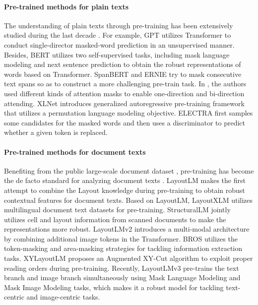 \documentclass[11pt]{article}
\begin{document}
\paragraph{Pre-trained methods for plain texts} The understanding of plain texts through pre-training has been extensively studied during the last decade \cite{devlin2018bert,yang2019xlnet,bao2020unilmv2,liu2019roberta,lewis2019bart,lan2019albert,jiang2020convbert,he2020deberta,dong2019unified,lample2019cross,lin2021few,xue2020mt5}. For example, GPT \cite{radford2019language,brown2020language} utilizes Transformer \cite{vaswani2017attention} to conduct single-director masked-word prediction in an unsupervised manner. Besides, BERT \cite{devlin2018bert} utilizes two self-supervised tasks, including mask language modeling and next sentence prediction to obtain the robust representations of words based on Transformer. SpanBERT \cite{joshi2020spanbert} and ERNIE \cite{zhang2019ernie} try to mask consecutive text spans so as to construct a more challenging pre-train task. In \cite{dong2019unified}, the authors used different kinds of attention masks to enable one-direction and bi-direction attending. XLNet \cite{yang2019xlnet} introduces generalized 
autoregressive pre-training framework that utilizes a permutation language modeling objective. ELECTRA \cite{clark2020electra} first samples some candidates for the masked words and then uses a discriminator to predict whether a given token is replaced.

\paragraph{Pre-trained methods for document texts}
Benefiting from the public large-scale document dataset \cite{lewis2006building}, pre-training has become the de facto standard for analyzing document texts \cite{zhang2020trie,wang2021layoutreader,xu2021layoutxlm,li2022dit,appalaraju2021docformer,garncarek2021lambert,gu2022xylayoutlm,gu2022unified,wu2021lampret,wang2022lilt}. LayoutLM \cite{xu2020layoutlm} makes the first attempt to combine the Layout knowledge during pre-training to obtain robust contextual features for document texts. Based on LayoutLM, LayoutXLM \cite{xu2021layoutxlm} utilizes multilingual document text datasets for pre-training. StructuralLM \cite{li2021structurallm} jointly utilizes cell
and layout information from scanned documents to make the representations more robust.
LayoutLMv2 \cite{xu2020layoutlmv2} introduces a multi-modal architecture by combining additional image tokens in the Transformer. BROS \cite{hong2021bros} utilizes the token-masking and area-masking strategies for tackling information extraction tasks. XYLayoutLM \cite{gu2022xylayoutlm} proposes an Augmented XY-Cut algorithm to exploit proper reading orders during pre-training. Recently, LayoutLMv3 \cite{huang2022layoutlmv3} pre-trains the text branch and image branch simultaneously using Mask Language Modeling and Mask Image Modeling tasks, which makes it a robust model for tackling text-centric and image-centric tasks.
\end{document}
